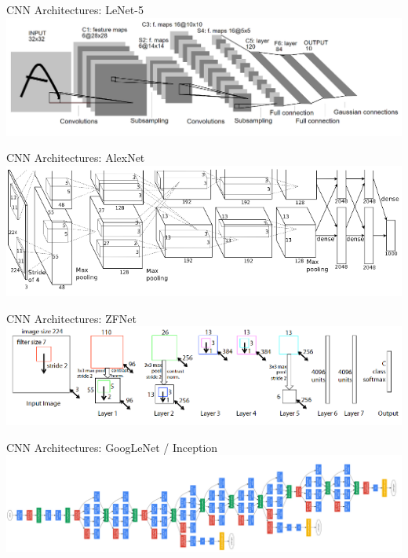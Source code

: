 \begin{frame}{CNN Architectures: LeNet-5}
	\centering
	\includegraphics[width=\textwidth]{../Images/CNNArchitectures/LeNet-5.png}\\
\end{frame}

\begin{frame}{CNN Architectures: AlexNet}
	\centering
	\includegraphics[width=\textwidth]{../Images/CNNArchitectures/AlexNet.png}\\
\end{frame}

\begin{frame}{CNN Architectures: ZFNet}
	\centering
	\includegraphics[width=\textwidth]{../Images/CNNArchitectures/ZFNet.png}\\
\end{frame}

\begin{frame}{CNN Architectures: GoogLeNet / Inception}
	\centering
	\includegraphics[width=\textwidth]{../Images/CNNArchitectures/GoogLeNet.png}\\
\end{frame}

